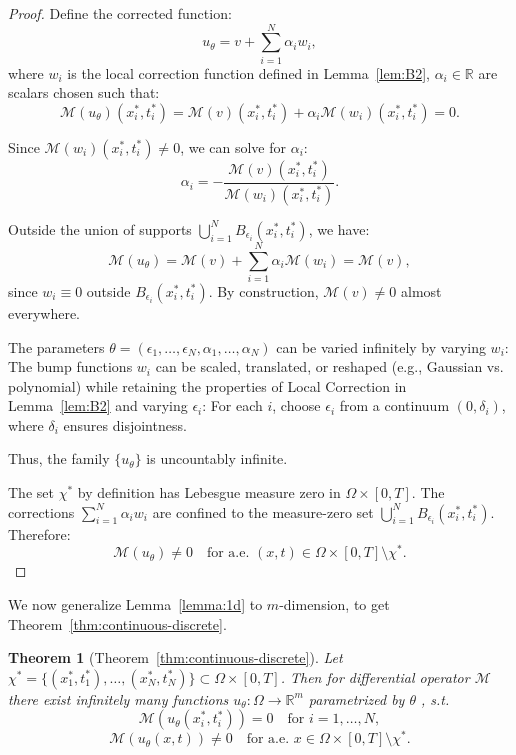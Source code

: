 \documentclass{article}
\theoremstyle{plain}
\newtheorem{theorem}{Theorem}[section]
\theoremstyle{definition}
\theoremstyle{remark}
\begin{document}
\begin{proof}
    Define the corrected function:
$$
u_\theta = v + \sum_{i=1}^N \alpha_i w_i,
$$
where $w_i$ is the local correction function defined in Lemma~\ref{lem:B2}, $\alpha_i \in \mathbb{R}$ are scalars chosen such that:
$$
\mathcal{M}(u_\theta)(x_i^*, t_i^*) = \mathcal{M}(v)(x_i^*, t_i^*) + \alpha_i \mathcal{M}(w_i)(x_i^*, t_i^*) = 0.
$$

Since $\mathcal{M}(w_i)(x_i^*, t_i^*) \neq 0$, we can solve for $\alpha_i$:
$$
\alpha_i = -\frac{\mathcal{M}(v)(x_i^*, t_i^*)}{\mathcal{M}(w_i)(x_i^*, t_i^*)}.
$$

Outside the union of supports $\bigcup_{i=1}^N B_{\epsilon_i}(x_i^*, t_i^*)$, we have:
$$
\mathcal{M}(u_\theta) = \mathcal{M}(v) + \sum_{i=1}^N \alpha_i \mathcal{M}(w_i) = \mathcal{M}(v),
$$
since $w_i \equiv 0$ outside $B_{\epsilon_i}(x_i^*, t_i^*)$. By construction, $\mathcal{M}(v) \neq 0$ almost everywhere. 

The parameters $\theta = (\epsilon_1, \dots, \epsilon_N, \alpha_1, \dots, \alpha_N)$ can be varied infinitely by varying $w_i$: The bump functions $w_i$ can be scaled, translated, or reshaped (e.g., Gaussian vs. polynomial) while retaining the properties of Local Correction in Lemma~\ref{lem:B2} and varying $\epsilon_i$: For each $i$, choose $\epsilon_i$ from a continuum $(0, \delta_i)$, where $\delta_i$ ensures disjointness.

Thus, the family $\{u_\theta\}$ is uncountably infinite.

The set $\chi^*$ by definition has Lebesgue measure zero in $\Omega \times [0,T]$. The corrections $\sum_{i=1}^N \alpha_i w_i$ are confined to the measure-zero set $\bigcup_{i=1}^N B_{\epsilon_i}(x_i^*, t_i^*)$. Therefore:
$$
\mathcal{M}(u_\theta) \neq 0 \quad \text{for a.e. } (x,t) \in \Omega \times [0,T] \setminus \chi^*.
$$
\end{proof}


We now generalize Lemma~\ref{lemma:1d} to $m$-dimension, to get Theorem~\ref{thm:continuous-discrete}.

\begin{theorem}[Theorem~\ref{thm:continuous-discrete}]
    Let $\chi^* = \{(x^*_1,t^*_1),\dots,(x^*_N,t^*_N)\}\subset \Omega\times[0,T]$. Then for differential operator $\mathcal M$ there exist infinitely many functions
$u_\theta : \Omega \to \mathbb{R}^m$ parametrized by $\theta$ , s.t.
$$ \mathcal{M}(u_\theta(x^*_i,t^*_i)) = 0 \quad \text{for } i=1,\dots,N,$$ $$ 
   \mathcal{M}(u_\theta(x,t)) \neq 0
   \quad \text{for a.e. } x \in \Omega\times[0,T] \setminus \chi^*.$$
\end{theorem}
\end{document}
